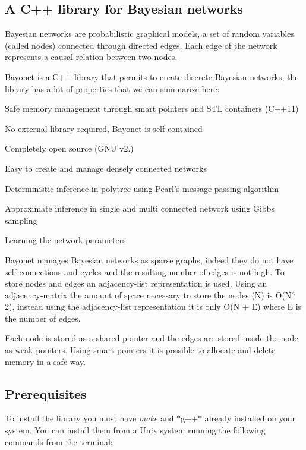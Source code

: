 \subsection*{A C++ library for Bayesian networks }

Bayesian networks are probabilistic graphical models, a set of random variables (called nodes) connected through directed edges. Each edge of the network represents a causal relation between two nodes.

Bayonet is a C++ library that permits to create discrete Bayesian networks, the library has a lot of properties that we can summarize here\-:


\begin{DoxyItemize}
\item Safe memory management through smart pointers and S\-T\-L containers (C++11)
\item No external library required, Bayonet is self-\/contained
\item Completely open source (G\-N\-U v2.)
\item Easy to create and manage densely connected networks
\item Deterministic inference in polytree using Pearl's message passing algorithm
\item Approximate inference in single and multi connected network using Gibbs sampling
\item Learning the network parameters
\end{DoxyItemize}

Bayonet manages Bayesian networks as sparse graphs, indeed they do not have self-\/connections and cycles and the resulting number of edges is not high. To store nodes and edges an adjacency-\/list representation is used. Using an adjacency-\/matrix the amount of space necessary to store the nodes (N) is O(\-N$^\wedge$2), instead using the adjacency-\/list representation it is only O(N + E) where E is the number of edges.

Each node is stored as a shared pointer and the edges are stored inside the node as weak pointers. Using smart pointers it is possible to allocate and delete memory in a safe way.

\subsection*{Prerequisites }

To install the library you must have {\itshape make} and $\ast$g++$\ast$ already installed on your system. You can install them from a Unix system running the following commands from the terminal\-:

